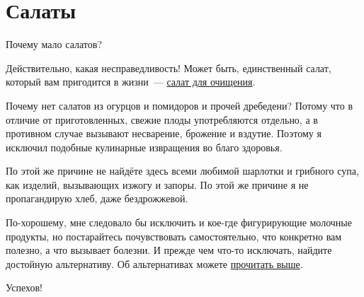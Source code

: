 \chapter*{Салаты}
\label{sec:salats}

Почему мало салатов?

Действительно, какая несправедливость!
Может быть, единственный салат, который вам пригодится в жизни~--- \hyperref[cleanSalat]{салат для очищения}.


Почему нет салатов из огурцов и помидоров и прочей дребедени? Потому что в отличие от приготовленных, свежие плоды употребляются отдельно, а в противном случае вызывают несварение, брожение и вздутие. Поэтому я исключил подобные кулинарные извращения во благо здоровья.

По этой же причине не найдёте здесь всеми любимой шарлотки и грибного супа, как изделий, вызывающих изжогу и запоры. По этой же причине я не пропагандирую хлеб, даже бездрожжевой.

По-хорошему, мне следовало бы исключить и кое-где фигурирующие молочные продукты, но постарайтесь почувствовать самостоятельно, что конкретно вам полезно, а что вызывает болезни. И прежде чем что-то исключать, найдите достойную альтернативу.
Об альтернативах можете \hyperref[sec:replace]{прочитать выше}.

Успехов!




